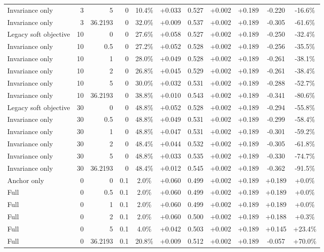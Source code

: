 \begin{table}[htbp]
\begin{tabular}{lrrrccccccc}
Invariance only & 3 & 5 & 0 & 10.4\% & +0.033 & 0.527 & +0.002 & +0.189 & -0.220 & -16.6\% \\
Invariance only & 3 & 36.2193 & 0 & 32.0\% & +0.009 & 0.537 & +0.002 & +0.189 & -0.305 & -61.6\% \\
Legacy soft objective & 10 & 0 & 0 & 27.6\% & +0.058 & 0.527 & +0.002 & +0.189 & -0.250 & -32.4\% \\
Invariance only & 10 & 0.5 & 0 & 27.2\% & +0.052 & 0.528 & +0.002 & +0.189 & -0.256 & -35.5\% \\
Invariance only & 10 & 1 & 0 & 28.0\% & +0.049 & 0.528 & +0.002 & +0.189 & -0.261 & -38.1\% \\
Invariance only & 10 & 2 & 0 & 26.8\% & +0.045 & 0.529 & +0.002 & +0.189 & -0.261 & -38.4\% \\
Invariance only & 10 & 5 & 0 & 30.0\% & +0.032 & 0.531 & +0.002 & +0.189 & -0.288 & -52.7\% \\
Invariance only & 10 & 36.2193 & 0 & 38.8\% & +0.010 & 0.543 & +0.002 & +0.189 & -0.341 & -80.6\% \\
Legacy soft objective & 30 & 0 & 0 & 48.8\% & +0.052 & 0.528 & +0.002 & +0.189 & -0.294 & -55.8\% \\
Invariance only & 30 & 0.5 & 0 & 48.8\% & +0.049 & 0.531 & +0.002 & +0.189 & -0.299 & -58.4\% \\
Invariance only & 30 & 1 & 0 & 48.8\% & +0.047 & 0.531 & +0.002 & +0.189 & -0.301 & -59.2\% \\
Invariance only & 30 & 2 & 0 & 48.4\% & +0.044 & 0.532 & +0.002 & +0.189 & -0.305 & -61.8\% \\
Invariance only & 30 & 5 & 0 & 48.8\% & +0.033 & 0.535 & +0.002 & +0.189 & -0.330 & -74.7\% \\
Invariance only & 30 & 36.2193 & 0 & 48.4\% & +0.012 & 0.545 & +0.002 & +0.189 & -0.362 & -91.5\% \\
Anchor only & 0 & 0 & 0.1 & 2.0\% & +0.060 & 0.499 & +0.002 & +0.189 & +0.189 & +0.0\% \\
Full & 0 & 0.5 & 0.1 & 2.0\% & +0.060 & 0.499 & +0.002 & +0.189 & +0.189 & +0.0\% \\
Full & 0 & 1 & 0.1 & 2.0\% & +0.060 & 0.499 & +0.002 & +0.189 & +0.189 & +0.0\% \\
Full & 0 & 2 & 0.1 & 2.0\% & +0.060 & 0.500 & +0.002 & +0.189 & +0.188 & +0.3\% \\
Full & 0 & 5 & 0.1 & 4.0\% & +0.042 & 0.503 & +0.002 & +0.189 & +0.145 & +23.4\% \\
Full & 0 & 36.2193 & 0.1 & 20.8\% & +0.009 & 0.512 & +0.002 & +0.189 & -0.057 & +70.0\% \\

\end{tabular}
\end{table}
